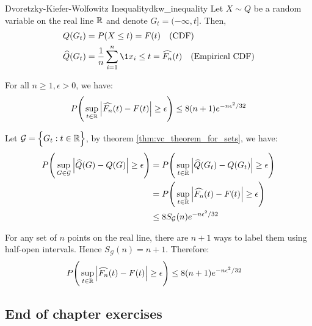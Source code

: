 \begin{corollary}{Dvoretzky-Kiefer-Wolfowitz Inequality}{dkw_inequality}
    Let $X\sim Q$ be a random variable on the real line $\mathbb{R}$ and denote $G_t=(-\infty, t]$. Then,
    \begin{align*}
        Q(G_t) &= P(X\le t) = F(t) \ \ \ \text{(CDF)} \\
        \widehat{Q}(G_t) &= \frac{1}{n} \sum_{i=1}^n\1{x_i \le t} = \widehat{F_n}(t) \ \ \ \text{(Empirical CDF)}
    \end{align*}

    \noindent For all $n\ge1, \epsilon > 0$, we have:
    \begin{align*}
        P\Bigg( 
            \sup_{t \in \mathbb{R}} \Big|  \widehat{F_n}(t) - F(t)  \Big| \ge \epsilon
         \Bigg) \le 8(n+1)e^{-n\epsilon^2/32}
    \end{align*}
\end{corollary}

\begin{proof*}
    Let $\mathcal{G} = \Big\{  G_t: t\in\mathbb{R}  \Big\}$, by theorem \ref{thm:vc_theorem_for_sets}, we have:
    \begin{align*}
        P\Bigg( 
            \sup_{G\in\mathcal{G}} \Big|  \widehat{Q}(G) - Q(G)  \Big| \ge \epsilon
         \Bigg)
        &= P\Bigg( 
            \sup_{t\in\mathbb{R}} \Big|  \widehat{Q}(G_t) - Q(G_t)  \Big| \ge \epsilon
         \Bigg)\\
        &= P\Bigg( 
            \sup_{t\in\mathbb{R}} \Big|  \widehat{F_n}(t) - F(t)  \Big| \ge \epsilon
         \Bigg)\\
        &\le 8S_\mathcal{G}(n)e^{-n\epsilon^2/32}
    \end{align*}

    \noindent For any set of $n$ points on the real line, there are $n+1$ ways to label them using half-open intervals. Hence $S_\mathcal{G}(n)=n+1$. Therefore:
    \begin{align*}
        P\Bigg( 
            \sup_{t\in\mathbb{R}} \Big|  \widehat{F_n}(t) - F(t)  \Big| \ge \epsilon
         \Bigg)
        &\le 8(n+1)e^{-n\epsilon^2/32}
    \end{align*}
\end{proof*}

\newpage


\subsection{End of chapter exercises}

